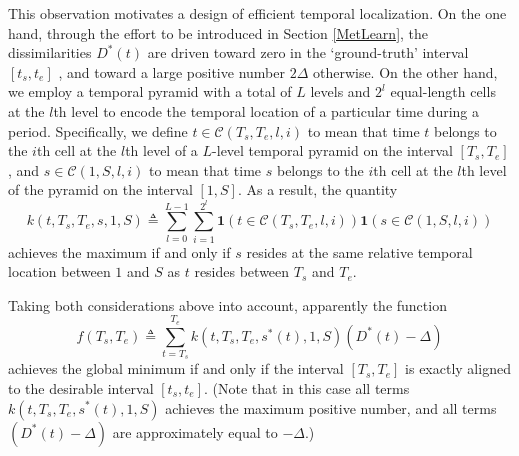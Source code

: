 \documentclass[10pt,twocolumn,letterpaper]{article}
\begin{document}
This observation motivates a design of efficient temporal localization. On the one hand, through the effort to be introduced in Section \ref{MetLearn}, the dissimilarities $D^{*}(t)$ are driven toward zero in the `ground-truth' interval $[t_{s}, t_{e}]$ , and toward a large positive number $2\Delta$ otherwise. On the other hand, we employ a temporal pyramid with a total of $L$ levels and $2^{l}$ equal-length cells at the $l$th level to encode the temporal location of a particular time during a period. Specifically, we define $t\in\mathcal{C}(T_{s},T_{e}, l,i)$ to mean that time $t$ belongs to the $i$th cell at the $l$th level of a $L$-level temporal pyramid on the interval $[T_{s},T_{e}]$, and $s\in\mathcal{C}(1,S, l,i)$ to mean that time $s$ belongs to the $i$th cell at the $l$th level of the pyramid on the interval $[1,S]$. As a result, the quantity
\begin{equation}
k(t, T_{s},T_{e}, s, 1,S)\triangleq\sum^{L-1}_{l=0}\sum^{2^{l}}_{i=1} \mathbf{1}(t\in\mathcal{C}(T_{s},T_{e}, l,i))\mathbf{1}(s\in\mathcal{C}(1,S, l,i))
\end{equation}
achieves the maximum if and only if $s$ resides at the same relative temporal location between $1$ and $S$ as $t$ resides between $T_{s}$ and $T_{e}$.

Taking both considerations above into account, apparently the function
\begin{equation}
\label{quality}
f(T_{s}, T_{e})\triangleq\sum^{T_{e}}_{t=T_{s}}k(t, T_{s},T_{e}, s^{*}(t), 1,S)(D^{*}(t)-\Delta)
\end{equation}
achieves the global minimum if and only if the interval $[T_{s}, T_{e}]$ is exactly aligned to the desirable interval $[t_{s}, t_{e}]$. (Note that in this case all terms $k(t, T_{s},T_{e}, s^{*}(t), 1,S)$ achieves the maximum positive number, and all terms $(D^{*}(t)-\Delta)$ are approximately equal to $-\Delta$.)
\end{document}
